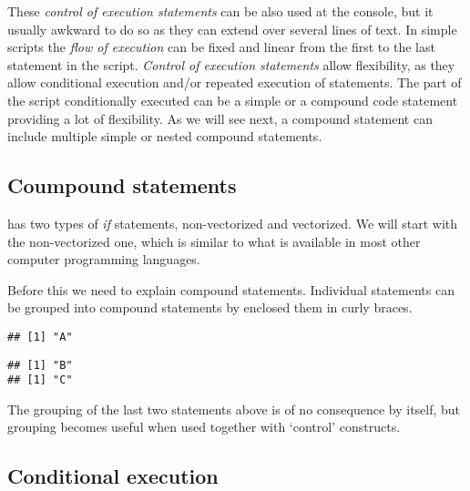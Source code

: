 \documentclass[krantz2]{krantz}\usepackage{knitr}%
\begin{document}
These \emph{control of execution statements} can be also used at the \Rlang console, but it usually awkward to do so as they can extend over several lines of text. In simple scripts the \emph{flow of execution} can be fixed and linear from the first to the last statement in the script. \emph{Control of execution statements} allow flexibility, as they allow conditional execution  and/or repeated execution of statements. The part of the script conditionally executed can be a simple or a compound code statement providing a lot of flexibility. As we will see next, a compound statement can include multiple simple or nested compound statements.

\subsection{Coumpound statements}

\Rpgrm has two types of \emph{if} statements, non-vectorized and vectorized. We will start with the non-vectorized one, which is similar to what is available in most other computer programming languages.

Before this we need to explain compound statements. Individual statements can be grouped into compound statements by enclosed them in curly braces.

\begin{knitrout}\footnotesize
{}\color{fgcolor}\begin{kframe}
\begin{alltt}
\hlstd{(}\hlstd{)}
\end{alltt}
\begin{verbatim}
## [1] "A"
\end{verbatim}
\begin{alltt}
\hlstd{\{}
  \hlstd{(}\hlstd{)}
  \hlstd{(}\hlstd{)}
\hlstd{\}}
\end{alltt}
\begin{verbatim}
## [1] "B"
## [1] "C"
\end{verbatim}
\end{kframe}
\end{knitrout}

The grouping of the last two statements above is of no consequence by itself, but grouping becomes useful when used together with `control' constructs.

\subsection{Conditional execution}
\end{document}
